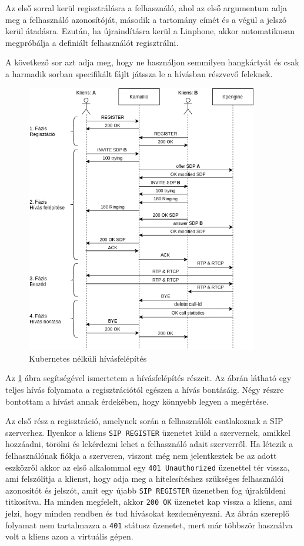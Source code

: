 Az első sorral kerül regisztrálásra a felhasználó, ahol az első argumentum adja meg a 
felhasználó azonosítóját, második a tartomány címét és a végül a jelszó kerül átadásra. 
Ezután, ha újraindításra kerül a Linphone, akkor automatikusan megpróbálja a definiált
felhasználót regisztrálni. 

A következő sor azt adja meg, hogy ne használjon semmilyen hangkártyát és csak a 
harmadik sorban specifikált fájlt játssza le a hívásban részvevő feleknek.

\begin{figure}[!ht]
	\centering
	\includegraphics[width=0.9\textwidth, keepaspectratio]{figures/basic_call_flow.png}
	\caption{Kubernetes nélküli hívásfelépítés}
	\label{fig:callflow}
\end{figure}

Az \ref{fig:callflow} ábra segítségével ismertetem a hívásfelépítés részeit.  Az ábrán 
látható egy teljes hívás folyamata a regisztrációtól egészen a hívás bontásáig. Négy 
részre bontottam a hívást annak érdekében, hogy könnyebb legyen a megértése.

Az első rész a regisztráció, amelynek során a felhasználók csatlakoznak a SIP szerverhez.
Ilyenkor a kliens \texttt{SIP REGISTER} üzenetet küld a szervernek, amikkel hozzáadni, 
törölni és lekérdezni lehet a felhasználó adait szerverről. Ha létezik a felhasználónak 
fiókja a szerveren, viszont még nem jelentkeztek be az adott eszközről akkor az első 
alkalommal egy \texttt{401 Unauthorized} üzenettel tér vissza, ami felszólítja a klienst, 
hogy adja meg a hitelesítéshez szükséges felhasználói azonosítót és jelszót, amit egy 
újabb \texttt{SIP REGISTER} üzenetben fog újraküldeni titkosítva. Ha minden megfelelt, 
akkor \texttt{200 OK} üzenetet kap vissza a kliens, ami jelzi, hogy minden rendben és tud 
hívásokat kezdeményezni. Az ábrán szereplő folyamat nem tartalmazza a \texttt{401} 
státusz üzenetet, mert már többször használva volt a kliens azon a virtuális gépen.


